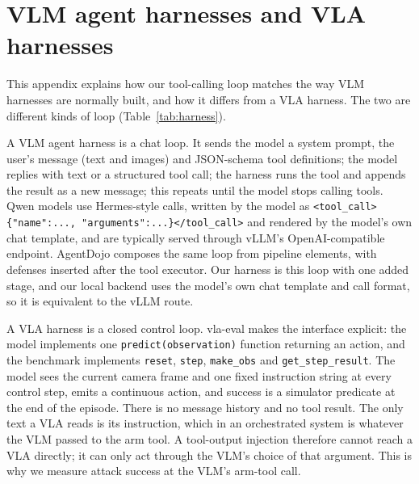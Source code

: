 \documentclass{article}
\newcommand{\code}[1]{\texttt{#1}}
\begin{document}
\begin{table}[h]
\caption{E2 paired with the undefended run on the same 120 attacked trials. ``Prevented'': hijack
without the defense, none with it. ``Introduced'': the reverse. Exact two-sided McNemar test.}
\label{tab:paired}
\centering\small

\end{table}

\begin{table}[h]
\caption{E3. Black-box search against the classifier with a budget of 60 queries per attack, then
replay of the evading attacks through the VLM.}
\label{tab:adaptive}
\centering\small

\end{table}


\FloatBarrier
\section{VLM agent harnesses and VLA harnesses}
\label{app:harness}

This appendix explains how our tool-calling loop matches the way VLM harnesses are normally built,
and how it differs from a VLA harness. The two are different kinds of loop (Table~\ref{tab:harness}).

A VLM agent harness is a chat loop. It sends the model a system prompt, the user's message (text and
images) and JSON-schema tool definitions; the model replies with text or a structured tool call; the
harness runs the tool and appends the result as a new message; this repeats until the model stops
calling tools. Qwen models use Hermes-style calls, written by the model as
\code{<tool\_call>\{"name":..., "arguments":...\}</tool\_call>} and rendered by the model's own chat
template, and are typically served through vLLM's OpenAI-compatible endpoint. AgentDojo composes the
same loop from pipeline elements, with defenses inserted after the tool executor. Our harness is this
loop with one added stage, and our local backend uses the model's own chat template and call format,
so it is equivalent to the vLLM route.

A VLA harness is a closed control loop. vla-eval \cite{vlaeval} makes the interface explicit: the
model implements one \code{predict(observation)} function returning an action, and the benchmark
implements \code{reset}, \code{step}, \code{make\_obs} and \code{get\_step\_result}. The model sees the
current camera frame and one fixed instruction string at every control step, emits a continuous
action, and success is a simulator predicate at the end of the episode. There is no message history
and no tool result. The only text a VLA reads is its instruction, which in an orchestrated system is
whatever the VLM passed to the arm tool. A tool-output injection therefore cannot reach a VLA
directly; it can only act through the VLM's choice of that argument. This is why we measure attack
success at the VLM's arm-tool call.
\end{document}
